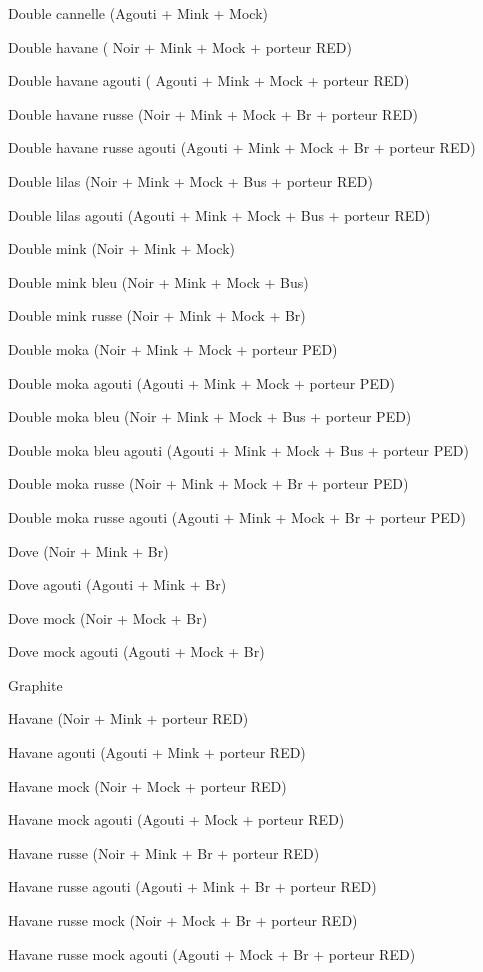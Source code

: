 \documentclass[a4paper,10pt]{article}
\begin{document}
Double cannelle (Agouti + Mink + Mock)
 
Double havane ( Noir + Mink + Mock +   porteur RED)
 
Double havane agouti ( Agouti + Mink +   Mock + porteur RED)
 
Double havane russe (Noir + Mink + Mock   + Br + porteur RED)
 
Double havane russe agouti (Agouti +   Mink + Mock + Br + porteur RED)
 
Double lilas (Noir + Mink + Mock + Bus +   porteur RED)
 
Double lilas agouti (Agouti + Mink +   Mock + Bus + porteur RED)
 
Double mink (Noir + Mink + Mock)
 
Double mink bleu (Noir + Mink + Mock +   Bus)
 
Double mink russe (Noir + Mink + Mock +   Br)
 
Double moka (Noir + Mink + Mock +   porteur PED)
 
Double moka agouti (Agouti + Mink + Mock   + porteur PED)
 
Double moka bleu (Noir + Mink + Mock +   Bus + porteur PED)
 
Double moka bleu agouti (Agouti + Mink +   Mock + Bus + porteur PED)
 
Double moka russe (Noir + Mink + Mock +   Br + porteur PED)
 
Double moka russe agouti (Agouti + Mink   + Mock + Br + porteur PED)
 
Dove (Noir + Mink + Br)
 
Dove agouti   (Agouti + Mink + Br)
 
Dove mock (Noir + Mock + Br)
 
Dove mock agouti   (Agouti + Mock + Br)
 
Graphite
 
Havane (Noir + Mink + porteur RED)
 
Havane agouti (Agouti + Mink + porteur   RED)
 
Havane mock (Noir + Mock + porteur RED)
 
Havane mock agouti (Agouti + Mock +   porteur RED)
 
Havane russe (Noir + Mink + Br + porteur   RED)
 
Havane russe agouti (Agouti + Mink + Br   + porteur RED)

Havane russe mock (Noir + Mock + Br + porteur RED)
 
Havane russe mock agouti (Agouti + Mock + Br + porteur RED)
\end{document}
